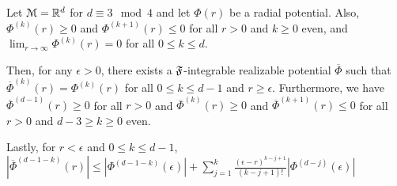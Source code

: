 \begin{lemma}\label{transConstruct}
Let $\mathcal{M} = {\mathbb{R}}^d$ for $d \equiv 3 \mod 4$ and let $\Phi(r)$ be a radial potential. Also, $\Phi^{(k)}(r) \geq 0$ and $\Phi^{(k+1)}(r)\leq 0$ for all $r > 0$ and $k \geq 0 $ even, and $\lim_{r \to \infty} \Phi^{(k)}(r) = 0$ for all $0 \leq k \leq d$. 

Then, for any $\epsilon > 0$, there exists a ${\mathfrak{F}}$-integrable realizable potential $\overline{\Phi}$  such that $\overline{\Phi}^{(k)}(r) = \Phi^{(k)}(r)$ for all $0 \leq k \leq d-1$ and $r \geq \epsilon$. Furthermore, we have $\overline{\Phi}^{(d-1)}(r) \geq 0$ for all $r  > 0$ and $\overline{\Phi}^{(k)}(r) \geq 0$ and $\overline{\Phi}^{(k+1)}(r)\leq 0$ for all $r > 0$ and $d - 3 \geq k \geq 0 $ even.

Lastly, for $r < \epsilon$ and $0 \leq k \leq d-1$, $|\overline{\Phi}^{(d-1-k)}(r)| \leq |\Phi^{(d-1-k)}(\epsilon)| + \sum_{j=1}^k \frac{(\epsilon - r)^{k-j+1}}{(k-j+1)!} |\Phi^{(d-j)}(\epsilon)|$
\end{lemma}

